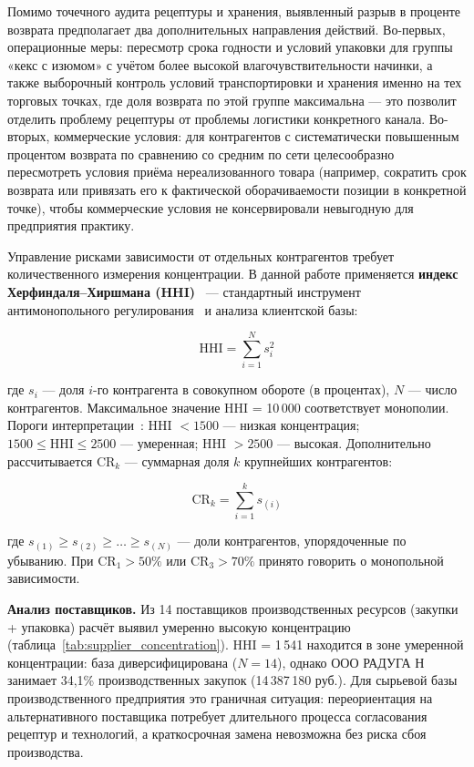 Помимо точечного аудита рецептуры и хранения, выявленный разрыв в проценте возврата предполагает два дополнительных направления действий. Во-первых, операционные меры: пересмотр срока годности и условий упаковки для группы «кекс с изюмом» с учётом более высокой влагочувствительности начинки, а также выборочный контроль условий транспортировки и хранения именно на тех торговых точках, где доля возврата по этой группе максимальна --- это позволит отделить проблему рецептуры от проблемы логистики конкретного канала. Во-вторых, коммерческие условия: для контрагентов с систематически повышенным процентом возврата по сравнению со средним по сети целесообразно пересмотреть условия приёма нереализованного товара (например, сократить срок возврата или привязать его к фактической оборачиваемости позиции в конкретной точке), чтобы коммерческие условия не консервировали невыгодную для предприятия практику.

Управление рисками зависимости от отдельных контрагентов требует количественного измерения концентрации. В данной работе применяется \textbf{индекс Херфиндаля--Хиршмана (HHI)}~\cite{rhoades1993herfindahl} --- стандартный инструмент антимонопольного регулирования~\cite{doj_hhi} и анализа клиентской базы:

\begin{equation}
\text{HHI} = \sum_{i=1}^{N} s_i^2
\end{equation}

где $s_i$ --- доля $i$-го контрагента в совокупном обороте (в процентах), $N$ --- число контрагентов. Максимальное значение HHI = 10\,000 соответствует монополии. Пороги интерпретации~\cite{doj_hhi}: HHI $< 1500$ --- низкая концентрация; $1500 \le \text{HHI} \le 2500$ --- умеренная; HHI $> 2500$ --- высокая. Дополнительно рассчитывается CR$_k$ --- суммарная доля $k$ крупнейших контрагентов:

\begin{equation}
\text{CR}_k = \sum_{i=1}^{k} s_{(i)}
\end{equation}

где $s_{(1)} \ge s_{(2)} \ge \dots \ge s_{(N)}$ --- доли контрагентов, упорядоченные по убыванию. При CR$_1 > 50\%$ или CR$_3 > 70\%$ принято говорить о монопольной зависимости.

\textbf{Анализ поставщиков.} Из 14 поставщиков производственных ресурсов (закупки + упаковка) расчёт выявил умеренно высокую концентрацию (таблица~\ref{tab:supplier_concentration}). HHI = 1\,541 находится в зоне умеренной концентрации: база диверсифицирована ($N = 14$), однако ООО РАДУГА Н занимает 34,1\% производственных закупок (14\,387\,180 руб.). Для сырьевой базы производственного предприятия это граничная ситуация: переориентация на альтернативного поставщика потребует длительного процесса согласования рецептур и технологий, а краткосрочная замена невозможна без риска сбоя производства.

